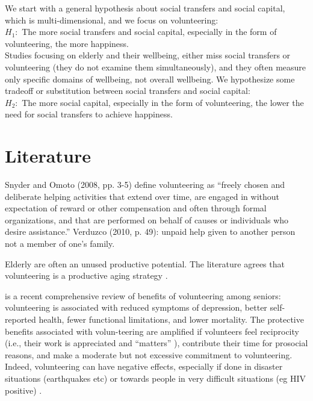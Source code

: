 \documentclass[10pt, letterpaper]{article}
\begin{document}
\begin{spacing}{1.4}
%
 We start with a general hypothesis about social
 transfers and social capital, which is multi-dimensional, and we focus  on volunteering:\\
\noindent$H_1:$ The more social transfers and social capital, especially in the
form of volunteering, the more happiness.\\

Studies focusing on elderly and their wellbeing, either miss social
transfers or volunteering (they do not examine them simultaneously), and they
often measure only specific domains of wellbeing, not overall wellbeing. We hypothesize some tradeoff or substitution between social transfers and
social capital:\\ 

\noindent$H_2:$ The more social capital, especially in the form of volunteering, the lower the need for social transfers to achieve happiness.\\ 


\section{Literature}


Snyder and Omoto (2008, pp. 3-5) %
 define volunteering as
 ``freely chosen and deliberate helping activities that
extend over time, are engaged in without expectation of reward or other
compensation
and often through formal organizations, and that are performed on behalf of
causes or
individuals who desire assistance.'' Verduzco (2010, p. 49): unpaid help given
to another person not a member of one's family. 

Elderly are often an unused productive potential.
The literature agrees that volunteering is a productive aging strategy
\citep[e.g.,][]{wilson12B,hank09}. 

\citet{anderson14} is a recent comprehensive review of benefits of
volunteering among seniors: volunteering is associated with reduced symptoms of
depression, better self-reported health, fewer functional limitations, and lower
mortality. The protective benefits associated with volun-teering are amplified if
volunteers feel reciprocity (i.e., their work is appreciated and ``matters'' ), contribute their
time for prosocial reasons, and make a moderate but not excessive commitment to
volunteering. Indeed, volunteering can have negative effects, especially if done
in disaster situations (earthquakes etc) or towards people in very difficult
situations (eg HIV positive) \citep{wilson12B}.


\end{spacing}
\end{document}
